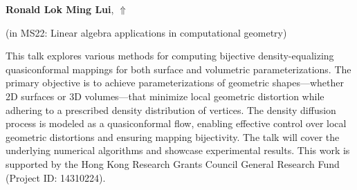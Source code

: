 \documentclass[ILAS2025-program.tex]{subfiles}
\begin{document}
\hypertarget{down0035}{}\begin{ilasabstract}
    
\textbf{Ronald Lok Ming Lui},  \hfill \hyperlink{up0035}{$\Uparrow$}
    
    
(in {\color{mstitle}MS22: Linear algebra applications in computational geometry})
        
\mtskip
    This talk explores various methods for computing bijective density-equalizing quasiconformal mappings for both surface and volumetric parameterizations. The primary objective is to achieve parameterizations of geometric shapes—whether 2D surfaces or 3D volumes—that minimize local geometric distortion while adhering to a prescribed density distribution of vertices. The density diffusion process is modeled as a quasiconformal flow, enabling effective control over local geometric distortions and ensuring mapping bijectivity. The talk will cover the underlying numerical algorithms and showcase experimental results. This work is supported by the Hong Kong Research Grants Council General Research Fund (Project ID: 14310224).

\end{ilasabstract}
    
\end{document}
